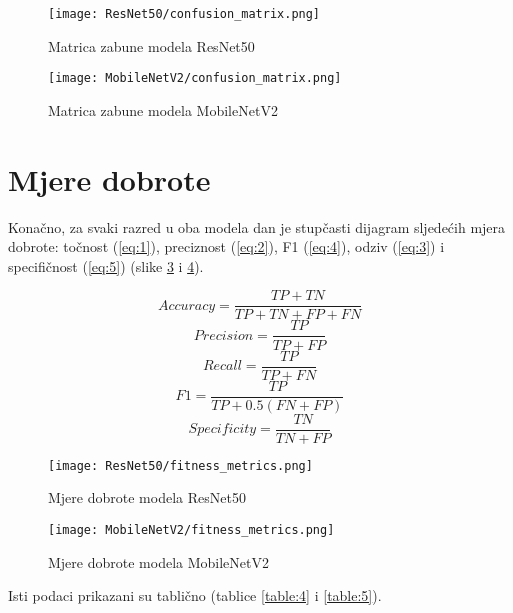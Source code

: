 \documentclass[conference, utf8]{IEEEtran}
\begin{document}
\begin{figure}[ht]
	\centering
	\texttt{[image: ResNet50/confusion\_matrix.png]}
	\caption{Matrica zabune modela ResNet50}
	\label{fig:RN50_conf_mat}
\end{figure}


\begin{figure}[ht]
	\centering
	\texttt{[image: MobileNetV2/confusion\_matrix.png]}
	\caption{Matrica zabune modela MobileNetV2}
	\label{fig:MN_conf_mat}
\end{figure}
\pagebreak



\section{Mjere dobrote}
 Konačno, za svaki razred u oba modela dan je stupčasti dijagram sljedećih mjera dobrote: točnost (\ref{eq:1}), preciznost (\ref{eq:2}), F1 (\ref{eq:4}), odziv (\ref{eq:3}) i specifičnost (\ref{eq:5}) (slike \ref{fig:RN50_fit_met} i \ref{fig:MN_fit_met}).

\begin{equation}
	Accuracy = \frac{TP + TN}{TP + TN + FP + FN} \label{eq:1}
\end{equation}
\begin{equation}
	Precision = \frac{TP}{TP + FP} \label{eq:2}
\end{equation}
\begin{equation}
	Recall = \frac{TP}{TP + FN} \label{eq:3}
\end{equation}
\begin{equation}
	F1 = \frac{TP}{TP + 0.5(FN + FP)}
\end{equation}
\begin{equation}
	Specificity = \frac{TN}{TN + FP} \label{eq:5}
\end{equation}


\begin{figure}[ht]
	\centering
	\texttt{[image: ResNet50/fitness\_metrics.png]}
	\caption{Mjere dobrote modela ResNet50}
	\label{fig:RN50_fit_met}
\end{figure}



\begin{figure}[ht]
  \centering
  \texttt{[image: MobileNetV2/fitness\_metrics.png]}
  \caption{Mjere dobrote modela MobileNetV2}
  \label{fig:MN_fit_met}
\end{figure}
\pagebreak
Isti podaci prikazani su tablično (tablice \ref{table:4} i \ref{table:5}).
\end{document}
